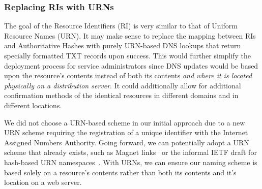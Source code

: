 \subsubsection{Replacing RIs with URNs}

The goal of the Resource Identifiers (RI) is very similar to that of Uniform
Resource Names (URN). It may make sense to replace the mapping between RIs and
Authoritative Hashes with purely URN-based DNS lookups that return specially
formatted TXT records upon success. This would further simplify the deployment
process for service administrators since DNS updates would be based upon the
resource's contents instead of both its contents \textit{and where it is located
physically on a distribution server}. It could additionally allow for additional
confirmation methods of the identical resources in different domains and in
different locations.

We did not choose a URN-based scheme in our initial approach due to a new URN
scheme requiring the registration of a unique identifier with the Internet
Assigned Numbers Authority. Going forward, we can potentially adopt a URN scheme
that already exists, such as Magnet links~\cite{MagnetLinks} or the informal
IETF draft for hash-based URN namespaces~\cite{draft-URN}. With URNs, we can
ensure our naming scheme is based solely on a resource's contents rather than
both its contents and it's location on a web server.
